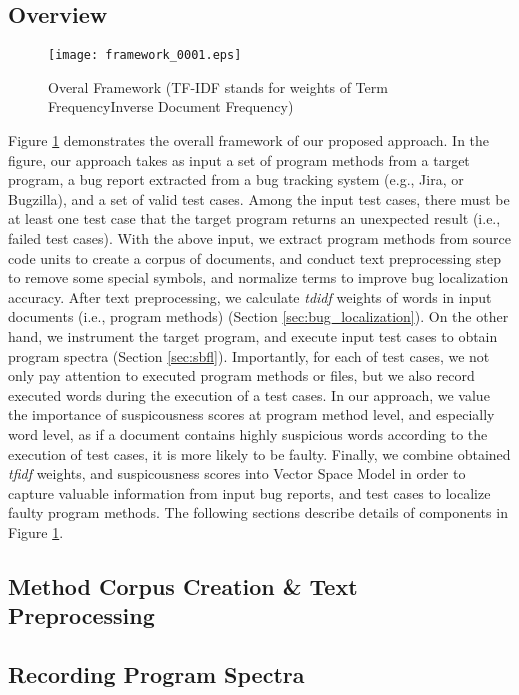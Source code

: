 \subsection{Overview}
\begin{figure}[t]
\center
\caption{Overal Framework (TF-IDF stands for weights of {Term Frequency\textendash Inverse Document Frequency})}
\texttt{[image: framework\_0001.eps]}
\label{fig:framework}
\end{figure}

Figure \ref{fig:framework} demonstrates the overall framework of our proposed approach. In the figure, our approach takes as input a set of program methods from a target program, a bug report extracted from a bug tracking system (e.g., Jira, or Bugzilla), and a set of valid test cases. Among the input test cases, there must be at least one test case that the target program returns an unexpected result (i.e., failed test cases). With the above input, we extract program methods from source code units to create a corpus of documents, and conduct text preprocessing step to remove some special symbols, and normalize terms to improve bug localization accuracy. After text preprocessing, we calculate \textit{td\textemdash idf} weights of words in input documents (i.e., program methods) (Section \ref{sec:bug_localization}).  On the other hand, we instrument the target program, and execute input test cases to obtain program spectra (Section \ref{sec:sbfl}). Importantly, for each of test cases, we not only pay attention to executed program methods or files, but we also record executed words during the execution of a test cases. In our approach, we value the importance of suspicousness scores at program method level, and especially word level, as if a document contains highly suspicious words according to the execution of test cases, it is more likely to be faulty. Finally, we combine obtained \textit{tf\textemdash idf} weights, and suspicousness scores into Vector Space Model in order to capture valuable information from input bug reports, and test cases to localize faulty program methods. The following sections describe details of components in Figure \ref{fig:framework}.

\subsection{Method Corpus Creation \& Text Preprocessing}


\subsection{Recording Program Spectra}\label{sec:record_spectra}


